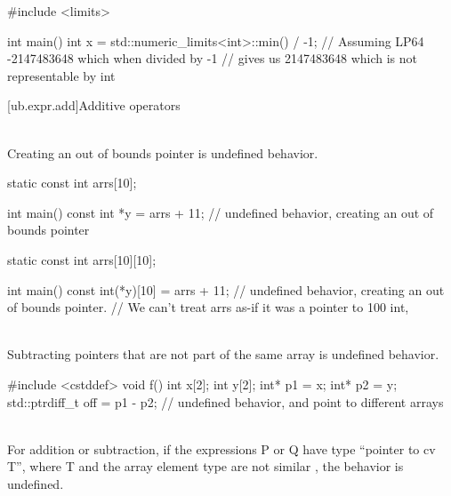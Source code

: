 \pnum
\begin{example}
\begin{codeblock}
#include <limits>

int main() {
  int x =
      std::numeric_limits<int>::min() / -1; // Assuming LP64 -2147483648 which when divided by -1
                                            // gives us 2147483648 which is not representable by int
}
\end{codeblock}
\end{example}

[ub.expr.add]{Additive operators}

\pnum
{} \\
Creating an out of bounds pointer is undefined behavior.

\pnum
\begin{example}
\begin{codeblock}
static const int arrs[10]{};

int main() {
  const int *y = arrs + 11;             // undefined behavior, creating an out of bounds pointer
}
\end{codeblock}
\end{example}

\begin{example}
\begin{codeblock}
static const int arrs[10][10]{};

int main() {
  const int(*y)[10] = arrs + 11;        // undefined behavior, creating an out of bounds pointer.
                                        // We can't treat arrs as-if it was a pointer to 100 int,
}
\end{codeblock}
\end{example}

\pnum
{} \\
Subtracting pointers that are not part of the same array is undefined behavior.

\pnum
\begin{example}
\begin{codeblock}
#include <cstddef>
void f() {
  int x[2];
  int y[2];
  int* p1 = x;
  int* p2 = y;
  std::ptrdiff_t off = p1 - p2; // undefined behavior,  and  point to different arrays
}
\end{codeblock}
\end{example}

\pnum
{} \\
For addition or subtraction, if the expressions P or Q have type ``pointer to cv T'', where T and the array
element type are not similar , the behavior is undefined.

